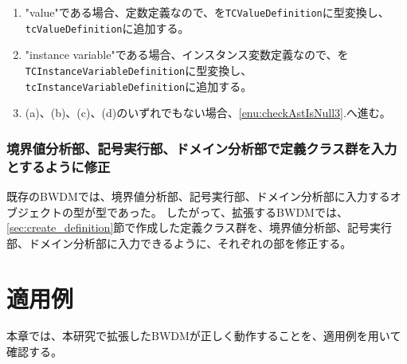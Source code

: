 \documentclass[uplatex, report, a4j, 10pt]{jsbook}
\newcommand\ttt[1]{\texttt{#1}}
\begin{document}
\begin{enumerate}
\begin{enumerate}
\begin{enumerate}
                \end{enumerate}
          \item "value"である場合、定数定義なので、\astDefinition{}を\ttt{TCValueDefinition}に型変換し、\ttt{tcValueDefinition}に追加する。
          \item "instance variable"である場合、インスタンス変数定義なので、\astDefinition{}を\ttt{TCInstanceVariableDefinition}に型変換し、\ttt{tcInstanceVariableDefinition}に追加する。
          \item (a)、(b)、(c)、(d)のいずれでもない場合、\ref{enu:checkAstIsNull3}.へ進む。
        \end{enumerate}
\end{enumerate}

\subsection{境界値分析部、記号実行部、ドメイン分析部で定義クラス群を入力とするように修正}
既存のBWDMでは、境界値分析部、記号実行部、ドメイン分析部に入力するオブジェクトの型が\TCExplicitFunctionDefinition{}型であった。
したがって、拡張するBWDMでは、\ref{sec:create_definition}節で作成した定義クラス群を、境界値分析部、記号実行部、ドメイン分析部に入力できるように、それぞれの部を修正する。

\chapter{適用例}\label{cha:Indication}
本章では、本研究で拡張したBWDMが正しく動作することを、適用例を用いて確認する。
\end{document}
